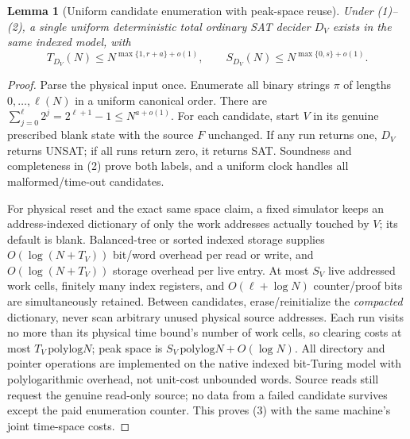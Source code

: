 \documentclass[11pt]{article}
\newtheorem{lemma}[theorem]{Lemma}
\begin{document}
\begin{lemma}[Uniform candidate enumeration with peak-space reuse]
\label{le:enum}
Under (1)--(2), a \emph{single} uniform deterministic total ordinary
SAT decider $D_V$ exists in the same indexed model, with
\[
 T_{D_V}(N)\le N^{\max\{1,r+a\}+o(1)},\qquad
 S_{D_V}(N)\le N^{\max\{0,s\}+o(1)}.                   \tag{3}
\]
\end{lemma}
\begin{proof}
Parse the physical input once. Enumerate all binary strings $\pi$
of lengths $0,\ldots,\ell(N)$ in a uniform canonical order. There are
$\sum_{j=0}^{\ell}2^j=2^{\ell+1}-1\le N^{a+o(1)}$.
For each candidate, start $V$ in its genuine prescribed blank state
with the source $F$ unchanged. If any run returns one, $D_V$
returns UNSAT; if all runs return zero, it returns SAT.
Soundness and completeness in (2) prove both labels, and a
uniform clock handles all malformed/time-out candidates.

For physical reset and the exact same space claim, a fixed simulator
keeps an address-indexed dictionary of only the work addresses actually
touched by $V$; its default is blank. Balanced-tree or sorted indexed
storage supplies $O(\log(N+T_V))$ bit/word overhead per read or
write, and $O(\log(N+T_V))$ storage overhead per live entry. At most
$S_V$ live addressed work cells, finitely many index registers, and
$O(\ell+\log N)$ counter/proof bits are simultaneously retained.
Between candidates, erase/reinitialize the \emph{compacted}
dictionary, never scan arbitrary unused physical source addresses.
Each run visits no more than its physical time bound's number of
work cells, so clearing costs at most $T_V\,\mathrm{polylog}N$;
peak space is $S_V\,\mathrm{polylog}N+O(\log N)$.
All directory and pointer operations are implemented on the native
indexed bit-Turing model with polylogarithmic overhead, not
unit-cost unbounded words. Source reads still request the genuine
read-only source; no data from a failed candidate survives except
the paid enumeration counter. This proves (3) with the same
machine's joint time-space costs.
\end{proof}
\end{document}
